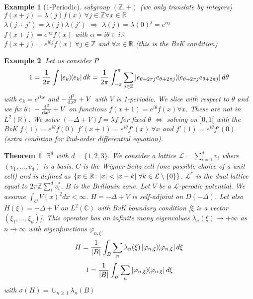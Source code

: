 \documentclass{article}
\newtheorem*{theorem}{Theorem}
\newtheorem*{example}{Example}
\newcommand{\ZZ}{\mathbb{Z}}
\newcommand{\RR}{\mathbb{R}}
\newcommand{\CC}{\mathbb{C}}
\newcommand{\cL}{\mathcal{L}}
\newcommand{\sig}{\sigma}
\newcommand{\la}{\lambda}
\begin{document}
\begin{example}[1-Periodic]
    subgroup $(\ZZ,+)$ (we only translate by integers)\\
    $f(x+j) = \la(j)f(x) \ \forall j \in \ZZ \forall x \in \RR$\\
    $\la(j+j') = \la(j)\la(j')$ $\Rightarrow$ $\la(j) = \la(0)^j = e^{\alpha j}$\\
    $f(x+j) = e^{\alpha j} f(x)$ with $\alpha = i \theta \in i\RR$\\
    $f(x+j) = e^{i\theta j} f(x) \ \forall j \in \ZZ$ and $\forall x \in \RR$  (this is the BvK condition)\\
\end{example}

\begin{example} 
  Let us consider $P$
  $$ 1 = \frac{1}{2\pi} \int \dyad{e_k}{e_k} dk
      = \frac{1}{2\pi} \int_{-\pi}^{\pi} \sum_{j\in\ZZ} \dyad{e_{\theta+2\pi j}{e_{\theta+2\pi j}}}   d\theta $$
  with $e_k = e^{ikx}$ and $- \dv[2]{}{x} + V$ with $V$ is 1-periodic.
  We slice with respect to $\theta$ and we fix $\theta \colon - \dv[2]{}{x} + V$ on functions $f(x+1) = e^{i\theta} f(x) \forall x$.
  These are not in $L^2(\RR)$.
  We solve $(-\Delta+V)f = \la f$ for fixed $\theta$
  $\Leftrightarrow$ solving on $]0,1[$ with the BvK $f(1) = e^{i\theta} f(0)$
  $f'(x+1) = e^{i\theta} f'(x) \ \forall x$ and 
  $f'(1) = e^{i\theta}f'(0)$ (extra condition for 2nd-order differential equation).
\end{example} 

\begin{theorem} 
  $\RR^d$ with $d=\{1,2,3\}$. 
  We consider a lattice $\cL = \sum_{i=1}^d v_i$ where $(v_1,...,v_d)$ is a basis.
  $C$ is the Wigner-Seitz cell (one possible choice of a unit cell) and is defined as $\qty{ x \in \RR \colon \abs{x} < \abs{x - k} \ \forall k \in \cL\setminus\{0\} }$.
  $\cL^*$ is the dual lattice equal to $2\pi\ZZ \sum_i^d v_i^*$.
  $B$ is the Brillouin zone.
  Let $V$ be a $\cL$-perodic potential. We assume $\int_C V(x)^2 dx < \infty$.
  $H = -\Delta + V$ is self-adjoint on $D(-\Delta)$.
  Let also $H(\xi) = -\Delta + V$ on $L^2(\CC)$ with BvK boundary condition [$\xi$ is a vector $(\xi_1,...,\xi_d)$].
  This operator has an infinite many eigenvalues $\la_n(\xi) \to + \infty$ as $ n\to\infty$ with eigenfunctions $\varphi_{n,\xi}$.
  $$ H = \frac{1}{\abs{B}} \int_B \sum_n \la_n(\xi) \dyad{\varphi_{n,\xi}} d\xi $$
  $$ 1 = \frac{1}{\abs{B}} \int_B \sum_n \dyad{\varphi_{n,\xi}} d\xi $$
  with $ \sig(H) = \cup_{n \ge 1} \la_n(B)$
\end{theorem} 
\end{document}
